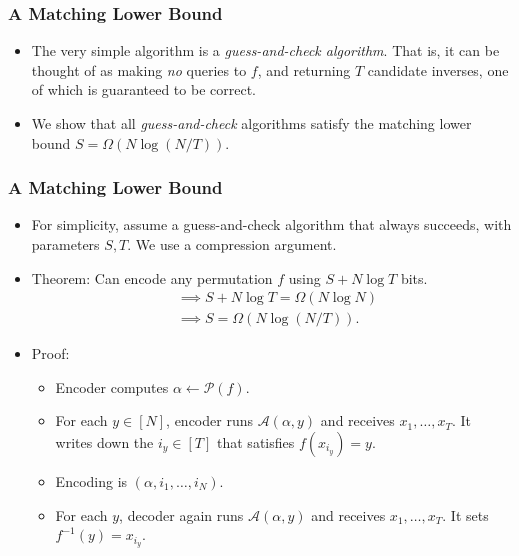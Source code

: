 \documentclass[usenames, dvipsnames, t, table]{beamer}
\newcommand{\A}{\mathcal{A}}
\renewcommand{\P}{\mathcal{P}}
\begin{document}
    \begin{frame}
    \frametitle{A Matching Lower Bound}
    \begin{itemize}
    \item The very simple algorithm is a \emph{guess-and-check algorithm}. That is, it can be thought of as making \emph{no} queries to $f$, and returning $T$ candidate inverses, one of which is guaranteed to be correct.
      \pause
    \item
      We show that all \emph{guess-and-check} algorithms satisfy the matching lower bound $S = \Omega(N \log (N/T))$.
    \end{itemize}
  \end{frame}

  \begin{frame}
    \frametitle{A Matching Lower Bound}
    \begin{itemize}
    \item For simplicity, assume a guess-and-check algorithm that always succeeds, with parameters $S, T$. We use a compression argument.
      \pause
    \item Theorem: Can encode any permutation $f$ using $S + N \log T$ bits.
      \pause
      \begin{align*}
        &\implies S + N \log T = \Omega(N \log N) \\
        &\implies S = \Omega(N \log (N/T)).
      \end{align*}
      \mypause
    \item Proof:
      \begin{itemize}
\item      Encoder computes $\alpha \gets \P(f)$.
      \pause
    \item For each $y \in [N]$, encoder runs $\A(\alpha, y)$ and receives $x_1, \dots, x_T$. It writes down the $i_y \in [T]$ that satisfies $f(x_{i_y}) = y$.
      \pause
    \item Encoding is $(\alpha, i_1, \dots, i_N)$.
      \pause
    \item For each $y$, decoder again runs $\A(\alpha, y)$ and receives $x_1, \dots, x_T$. It sets $f^{-1}(y) = x_{i_y}$.
    \end{itemize}
          \end{itemize}

      \end{frame}
\end{document}
